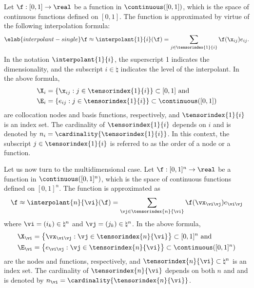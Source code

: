 Let $\f: [0, 1] \to \real$ be a function in $\continuous([0, 1])$, which is the
space of continuous functions defined on $[0, 1]$. The function is approximated
by virtue of the following interpolation formula:
\begin{equation} \elab{interpolant-single}
  \f \approx \interpolant{1}{i}(\f)
  = \sum_{j \in \tensorindex{1}{i}} \f(\x_{ij}) e_{ij}.
\end{equation}
In the notation $\interpolant{1}{i}$, the superscript 1 indicates the
dimensionality, and the subscript $i \in \natural$ indicates the level of the
interpolant. In the above formula,
\begin{align*}
  & \X_i = \{ \x_{ij}: j \in \tensorindex{1}{i} \} \subset [0, 1] \text{ and} \\
  & \E_i = \{ e_{ij}: j \in \tensorindex{1}{i} \} \subset \continuous([0, 1])
\end{align*}
are collocation nodes and basis functions, respectively, and
$\tensorindex{1}{i}$ is an index set. The cardinality of $\tensorindex{1}{i}$
depends on $i$ and is denoted by $n_i = \cardinality{\tensorindex{1}{i}}$. In
this context, the subscript $j \in \tensorindex{1}{i}$ is referred to as the
order of a node or a function.

Let us now turn to the multidimensional case. Let $\f: [0, 1]^n \to \real$ be a
function in $\continuous([0, 1]^n)$, which is the space of continuous functions
defined on $[0, 1]^n$. The function is approximated as
\[
  \f \approx \interpolant{n}{\vi}(\f)
  = \sum_{\vj \in \tensorindex{n}{\vi}} \f(\vx_{\vi \vj}) e_{\vi \vj}
\]
where $\vi = (i_k) \in \natural^n$ and $\vj = (j_k) \in \natural^n$. In the
above formula,
\begin{align*}
  & \X_{\vi} = \left\{ \vx_{\vi \vj}: \vj \in \tensorindex{n}{\vi} \right\} \subset [0, 1]^n \text{ and} \\
  & \E_{\vi} = \left\{ e_{\vi \vj}: \vj \in \tensorindex{n}{\vi} \right\} \subset \continuous([0, 1]^n)
\end{align*}
are the nodes and functions, respectively, and $\tensorindex{n}{\vi} \subset
\natural^n$ is an index set. The cardinality of $\tensorindex{n}{\vi}$ depends
on both $n$ and \vi and is denoted by $n_{\vi} =
\cardinality{\tensorindex{n}{\vi}}$.

